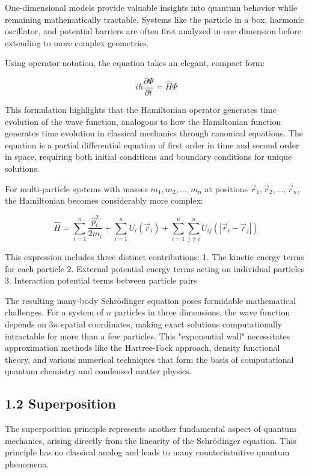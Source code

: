 \documentclass[italian]{HKNdocument}
\begin{document}
One-dimensional models provide valuable insights into quantum behavior while remaining mathematically tractable. Systems like the particle in a box, harmonic oscillator, and potential barriers are often first analyzed in one dimension before extending to more complex geometries.

Using operator notation, the equation takes an elegant, compact form:

\begin{equation*}
i \hbar \frac{\partial \Psi}{\partial t}=\hat{H} \Psi \tag{1.17}
\end{equation*}

This formulation highlights that the Hamiltonian operator generates time evolution of the wave function, analogous to how the Hamiltonian function generates time evolution in classical mechanics through canonical equations. The equation is a partial differential equation of first order in time and second order in space, requiring both initial conditions and boundary conditions for unique solutions.

For multi-particle systems with masses $m_{1}, m_{2}, \ldots, m_{n}$ at positions $\vec{r}_{1}, \vec{r}_{2}, \ldots, \vec{r}_{n}$, the Hamiltonian becomes considerably more complex:

\begin{equation*}
\hat{H}=\sum_{i=1}^{n} \frac{\hat{p}_i^{2}}{2 m_{i}}+\sum_{i=1}^{n} U_{i}\left(\vec{r}_{i}\right)+\sum_{i=1}^{n} \sum_{j \neq i}^{n} U_{i j}\left(\left|\vec{r}_{i}-\vec{r}_{j}\right|\right) \tag{1.18}
\end{equation*}

This expression includes three distinct contributions:
1. The kinetic energy terms for each particle
2. External potential energy terms acting on individual particles
3. Interaction potential terms between particle pairs

The resulting many-body Schrödinger equation poses formidable mathematical challenges. For a system of $n$ particles in three dimensions, the wave function depends on $3n$ spatial coordinates, making exact solutions computationally intractable for more than a few particles. This "exponential wall" necessitates approximation methods like the Hartree-Fock approach, density functional theory, and various numerical techniques that form the basis of computational quantum chemistry and condensed matter physics.

\subsection*{1.2 Superposition}
The superposition principle represents another fundamental aspect of quantum mechanics, arising directly from the linearity of the Schrödinger equation. This principle has no classical analog and leads to many counterintuitive quantum phenomena.
\end{document}
